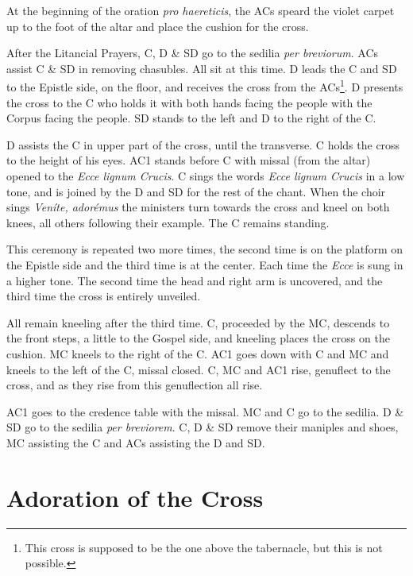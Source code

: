 {    \rubric At the beginning of the oration \textit{pro haereticis}, the ACs
    speard the violet carpet up to the foot of the altar and place the cushion
    for the cross.

    \rubric After the Litancial Prayers, C, D \& SD go to the sedilia
    \textit{per breviorum}. ACs assist C \& SD in removing chasubles. All sit
    at this time. D leads the C and SD to the Epistle side, on the floor, and
    receives the cross from the ACs\footnote{This cross is supposed to be the
    one above the tabernacle, but this is not possible.}. D presents the cross
    to the C who holds it with both hands facing the people with the Corpus
    facing the people. SD stands to the left and D to the right of the C.

    \rubric D assists the C in upper part of the cross, until the transverse. C
    holds the cross to the height of his eyes. AC1 stands before C with missal
    (from the altar) opened to the \textit{Ecce lignum Crucis}. C sings the
    words \textit{Ecce lignum Crucis} in a low tone, and is joined by the D and
    SD for the rest of the chant. When the choir sings \textit{Veníte,
    adorémus} the ministers turn towards the cross and kneel on both knees, all
    others following their example. The C remains standing.

    \rubric This ceremony is repeated two more times, the second time is on the
    platform on the Epistle side and the third time is at the center. Each time
    the \textit{Ecce} is sung in a higher tone. The second time the head and
    right arm is uncovered, and the third time the cross is entirely unveiled.

    \rubric All remain kneeling after the third time. C, proceeded by the MC,
    descends to the front steps, a little to the Gospel side, and kneeling
    places the cross on the cushion. MC kneels to the right of the C. AC1 goes
    down with C and MC and kneels to the left of the C, missal closed. C, MC
    and AC1 rise, genuflect to the cross, and as they rise from this
    genuflection all rise.

    \rubric AC1 goes to the credence table with the missal. MC and C go to the
    sedilia. D \& SD go to the sedilia \textit{per breviorem}. C, D \& SD
    remove their maniples and shoes, MC assisting the C and ACs assisting the D
    and SD.

    \section{Adoration of the Cross}

}
